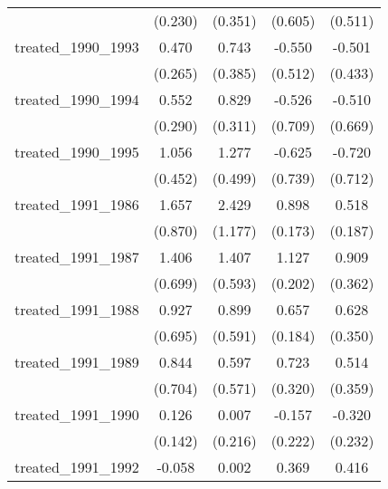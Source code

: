 {\begin{tabular}{l*{4}{c}}
            &     (0.230)         &     (0.351)         &     (0.605)         &     (0.511)         \\
[1em]
treated\_1990\_1993&       0.470         &       0.743         &      -0.550         &      -0.501         \\
            &     (0.265)         &     (0.385)         &     (0.512)         &     (0.433)         \\
[1em]
treated\_1990\_1994&       0.552         &       0.829\sym{**} &      -0.526         &      -0.510         \\
            &     (0.290)         &     (0.311)         &     (0.709)         &     (0.669)         \\
[1em]
treated\_1990\_1995&       1.056\sym{*}  &       1.277\sym{*}  &      -0.625         &      -0.720         \\
            &     (0.452)         &     (0.499)         &     (0.739)         &     (0.712)         \\
[1em]
treated\_1991\_1986&       1.657         &       2.429\sym{*}  &       0.898\sym{***}&       0.518\sym{**} \\
            &     (0.870)         &     (1.177)         &     (0.173)         &     (0.187)         \\
[1em]
treated\_1991\_1987&       1.406\sym{*}  &       1.407\sym{*}  &       1.127\sym{***}&       0.909\sym{*}  \\
            &     (0.699)         &     (0.593)         &     (0.202)         &     (0.362)         \\
[1em]
treated\_1991\_1988&       0.927         &       0.899         &       0.657\sym{***}&       0.628         \\
            &     (0.695)         &     (0.591)         &     (0.184)         &     (0.350)         \\
[1em]
treated\_1991\_1989&       0.844         &       0.597         &       0.723\sym{*}  &       0.514         \\
            &     (0.704)         &     (0.571)         &     (0.320)         &     (0.359)         \\
[1em]
treated\_1991\_1990&       0.126         &       0.007         &      -0.157         &      -0.320         \\
            &     (0.142)         &     (0.216)         &     (0.222)         &     (0.232)         \\
[1em]
treated\_1991\_1992&      -0.058         &       0.002         &       0.369         &       0.416         \\

\end{tabular}}
